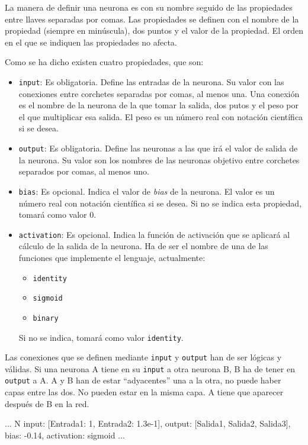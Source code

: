 \documentclass[a4paper]{article}
\begin{document}
La manera de definir una neurona es con su nombre seguido de las propiedades entre llaves separadas por comas. Las propiedades se definen con el nombre de la propiedad (siempre en minúscula), dos puntos y el valor de la propiedad. El orden en el que se indiquen las propiedades no afecta.

Como se ha dicho existen cuatro propiedades, que son:
\begin{itemize}
\item \texttt{input}: Es obligatoria. Define las entradas de la neurona. Su valor con las conexiones entre corchetes separadas por comas, al menos una. Una conexión es el nombre de la neurona de la que tomar la salida, dos putos y el peso por el que multiplicar esa salida. El peso es un número real con notación científica si se desea.

\item \texttt{output}: Es obligatoria. Define las neuronas a las que irá el valor de salida de la neurona. Su valor son los nombres de las neuronas objetivo entre corchetes separados por comas, al menos uno.

\item \texttt{bias}: Es opcional. Indica el valor de \textit{bias} de la neurona. El valor es un número real con notación científica si se desea. Si no se indica esta propiedad, tomará como valor 0.

\item \texttt{activation}: Es opcional. Indica la función de activación que se aplicará al cálculo de la salida de la neurona. Ha de ser el nombre de una de las funciones que implemente el lenguaje, actualmente:
	\begin{itemize}
	\item \texttt{identity}
	\item \texttt{sigmoid}
	\item \texttt{binary}
	\end{itemize}
Si no se indica, tomará como valor \texttt{identity}.
\end{itemize}

Las conexiones que se definen mediante \texttt{input} y \texttt{output} han de ser lógicas y válidas. Si una neurona A tiene en su \texttt{input} a otra neurona B, B ha de tener en \texttt{output} a A. A y B han de estar ``adyacentes'' una a la otra, no puede haber capas entre las dos. No pueden estar en la misma capa. A tiene que aparecer después de B en la red.

\begin{codebox}
...
N {
	input: [Entrada1: 1, Entrada2: 1.3e-1],
	output: [Salida1, Salida2, Salida3],
	bias: -0.14,
	activation: sigmoid
}
...
\end{codebox}
\end{document}
